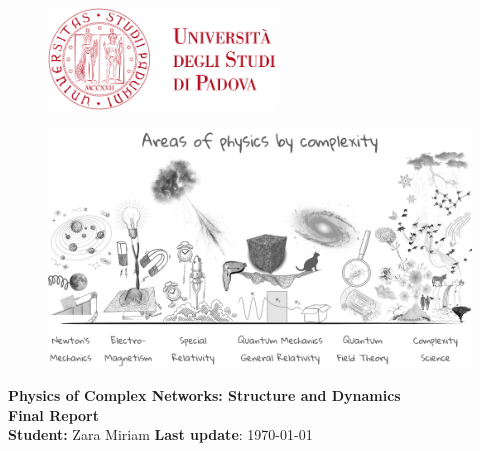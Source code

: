 \begin{center}

\vspace*{1cm}

\begin{figure}
  \raggedleft
  \begin{minipage}{4cm}
  \includegraphics[width=6cm]{images/logo.png}
  \end{minipage}
\end{figure}

\begin{figure}[H]
    \centering
    \includegraphics[width=\textwidth]{images/areas_of_physics.png} 
\end{figure}
\vspace*{1cm}
\textcolor{unipd}{\textbf{\large Physics of Complex Networks: Structure and Dynamics}} \\
\vspace*{1cm}
\textcolor{unipd}{\textbf{\huge Final Report}} \\
\vspace*{2cm}
\textbf{Student:} Zara Miriam \hfill \textbf{Last update}: \today\\\\
\end{center}



\thispagestyle{empty} %
\clearpage\setcounter{page}{1} %
